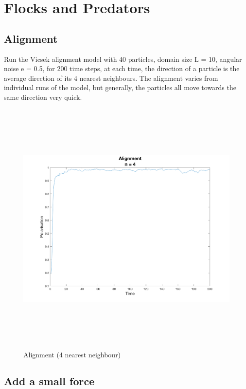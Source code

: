 \documentclass[12pt]{article}
\begin{document}
\newpage
\section{Flocks and Predators}
\doublespacing

\subsection{Alignment}

Run the Vicsek alignment model with 40 particles, domain size L = 10, angular noise e = 0.5, for 200 time steps, at each time, the direction of a particle is the average direction of its 4 nearest neighbours. The alignment varies from individual runs of the model, but generally, the particles all move towards the same direction very quick.

\begin{figure}[H] %
\centering
\includegraphics[width = 16 cm, height = 13cm]{palign.png}
\caption{Alignment (4 nearest neighbour)}
\label{fig:align}
\end{figure}



\subsection{Add a small force }
\end{document}
